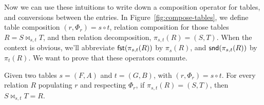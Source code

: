 Now we can use these intuitions to write down a composition operator
for tables, and conversions between the entries. In
Figure~\ref{fig:compose-tables}, we define table composition
$(r,\Phi_r) = s \circ t$, relation composition for those tables
$R = S \bowtie_{s,t} T$, and then relation decomposition,
$\pi_{s,t}(R) = (S,T)$. When the context is obvious, we'll abbreviate
$\mathsf{fst}(\pi_{s,t}(R))$ by $\pi_{s}(R)$, and $\mathsf{snd}(\pi_{s,t}(R))$ by
$\pi_t(R)$. We want to prove that these operators commute.

\begin{proposition}
  \label{prop:join-proj}
  Given two tables $s = (F,A)$ and $t = (G,B)$, with
  $(r, \Phi_r) = s \circ t$. For every relation $R$ populating $r$ and
  respecting $\Phi_r$, if $\pi_{s,t}(R) = (S,T)$, then
  $S \bowtie_{s,t} T = R$.
\end{proposition}

